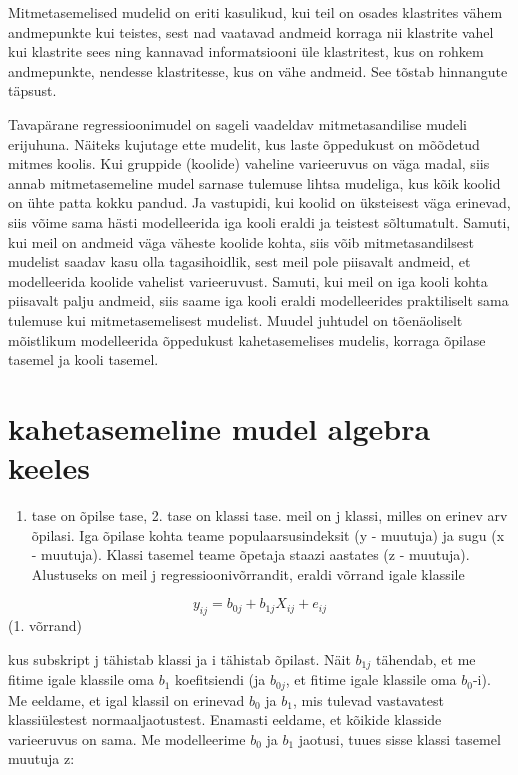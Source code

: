 \documentclass[]{book}
\providecommand{\tightlist}{%
  \setlength{\itemsep}{0pt}\setlength{\parskip}{0pt}}
\begin{document}
Mitmetasemelised mudelid on eriti kasulikud, kui teil on osades
klastrites vähem andmepunkte kui teistes, sest nad vaatavad andmeid
korraga nii klastrite vahel kui klastrite sees ning kannavad
informatsiooni üle klastritest, kus on rohkem andmepunkte, nendesse
klastritesse, kus on vähe andmeid. See tõstab hinnangute täpsust.

Tavapärane regressioonimudel on sageli vaadeldav mitmetasandilise mudeli
erijuhuna. Näiteks kujutage ette mudelit, kus laste õppedukust on
mõõdetud mitmes koolis. Kui gruppide (koolide) vaheline varieeruvus on
väga madal, siis annab mitmetasemeline mudel sarnase tulemuse lihtsa
mudeliga, kus kõik koolid on ühte patta kokku pandud. Ja vastupidi, kui
koolid on üksteisest väga erinevad, siis võime sama hästi modelleerida
iga kooli eraldi ja teistest sõltumatult. Samuti, kui meil on andmeid
väga väheste koolide kohta, siis võib mitmetasandilsest mudelist saadav
kasu olla tagasihoidlik, sest meil pole piisavalt andmeid, et
modelleerida koolide vahelist varieeruvust. Samuti, kui meil on iga
kooli kohta piisavalt palju andmeid, siis saame iga kooli eraldi
modelleerides praktiliselt sama tulemuse kui mitmetasemelisest mudelist.
Muudel juhtudel on tõenäoliselt mõistlikum modelleerida õppedukust
kahetasemelises mudelis, korraga õpilase tasemel ja kooli tasemel.

\section{kahetasemeline mudel algebra
keeles}\label{kahetasemeline-mudel-algebra-keeles}

\begin{enumerate}
\def\labelenumi{\arabic{enumi}.}
\tightlist
\item
  tase on õpilse tase, 2. tase on klassi tase. meil on j klassi, milles
  on erinev arv õpilasi. Iga õpilase kohta teame populaarsusindeksit (y
  - muutuja) ja sugu (x - muutuja). Klassi tasemel teame õpetaja staazi
  aastates (z - muutuja). Alustuseks on meil j regressioonivõrrandit,
  eraldi võrrand igale klassile
\end{enumerate}

\[y_{ij} = b_{0j} + b_{1j}X_{ij} + e_{ij}\] (1. võrrand)

kus subskript j tähistab klassi ja i tähistab õpilast. Näit \(b_{1j}\)
tähendab, et me fitime igale klassile oma \(b_1\) koefitsiendi (ja
\(b_{0j}\), et fitime igale klassile oma \(b_0\)-i). Me eeldame, et igal
klassil on erinevad \(b_0\) ja \(b_1\), mis tulevad vastavatest
klassiülestest normaaljaotustest. Enamasti eeldame, et kõikide klasside
varieeruvus on sama. Me modelleerime \(b_0\) ja \(b_1\) jaotusi, tuues
sisse klassi tasemel muutuja z:
\end{document}
